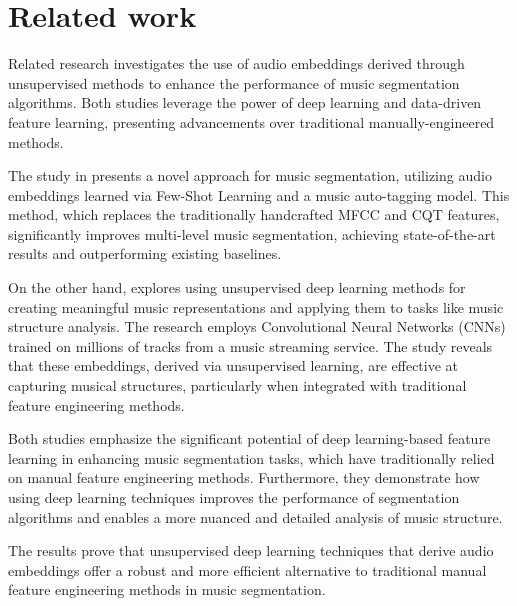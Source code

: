 \section{Related work}

Related research \cite{deepfeaturesegment, SalamonDeepSegmentation} investigates the use of audio embeddings derived through unsupervised methods to enhance the performance of music segmentation algorithms. Both studies leverage the power of deep learning and data-driven feature learning, presenting advancements over traditional manually-engineered methods.

The study in \cite{deepfeaturesegment} presents a novel approach for music segmentation, utilizing audio embeddings learned via Few-Shot Learning and a music auto-tagging model. This method, which replaces the traditionally handcrafted MFCC and CQT features, significantly improves multi-level music segmentation, achieving state-of-the-art results and outperforming existing baselines.

On the other hand, \cite{SalamonDeepSegmentation} explores using unsupervised deep learning methods for creating meaningful music representations and applying them to tasks like music structure analysis. The research employs Convolutional Neural Networks (CNNs) trained on millions of tracks from a music streaming service. The study reveals that these embeddings, derived via unsupervised learning, are effective at capturing musical structures, particularly when integrated with traditional feature engineering methods.

Both studies emphasize the significant potential of deep learning-based feature learning in enhancing music segmentation tasks, which have traditionally relied on manual feature engineering methods. Furthermore, they demonstrate how using deep learning techniques improves the performance of segmentation algorithms and enables a more nuanced and detailed analysis of music structure. 

The results prove that unsupervised deep learning techniques that derive audio embeddings offer a robust and more efficient alternative to traditional manual feature engineering methods in music segmentation.

